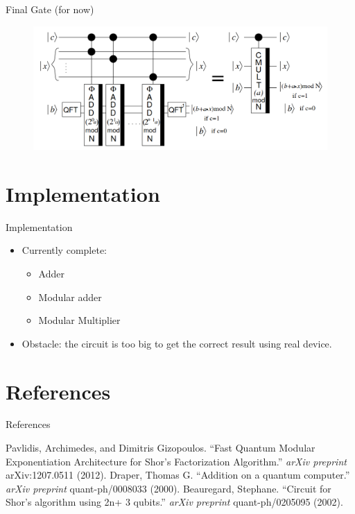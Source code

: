 \documentclass{beamer}
\begin{document}
\begin{frame}{Final Gate (for now)}
	\begin{figure}[h]
		\centering
		\includegraphics[width=\linewidth]{./ua.png}
	\end{figure}
\end{frame}

\section{Implementation}%
\label{sec:implementation}

\begin{frame}{Implementation}
	\begin{itemize}
		\item Currently complete:
			\begin{itemize}
				\item Adder
				\item Modular adder
				\item Modular Multiplier
			\end{itemize}
		\item Obstacle: the circuit is too big to get the correct result using
			real device.
	\end{itemize}
	
\end{frame}


\section{References}
\begin{frame}{References}
\begin{thebibliography}{10}
	Pavlidis, Archimedes, and Dimitris Gizopoulos. ``Fast
		Quantum Modular Exponentiation Architecture for Shor's Factorization
		Algorithm.'' \textit{arXiv preprint} arXiv:1207.0511 (2012). 
	Draper, Thomas G. ``Addition on a quantum computer.'' 
		\textit{arXiv preprint} quant-ph/0008033 (2000). 
	Beauregard, Stephane. ``Circuit for Shor's algorithm
		using 2n+ 3 qubits.'' \textit{arXiv preprint} quant-ph/0205095 (2002). 
	
\end{thebibliography}
\end{frame} 
\end{document}
